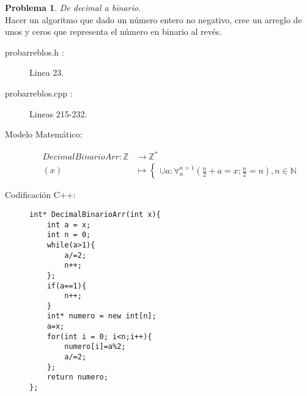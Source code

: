 \documentclass{article}
\theoremstyle{plain}
\theoremstyle{definition}
\newtheorem{problem}{Problema}
\begin{document}
\begin{problem} \emph{De decimal a binario.}\\
\hspace*{7mm}Hacer un algoritmo que dado un número entero no negativo, cree un arreglo de unos y ceros que representa el número en binario al revés.
\begin{description}
\item[probarreblos.h :] Linea 23. \item[probarreblos.cpp :] Lineas 215-232.

\item[Modelo Matemático:]
\begin{align*}
DecimalBinarioArr: \mathbb{Z} &\to \mathbb{Z}^{*}\\
(x) &\mapsto
\begin{cases}
\cup a : \forall_{n}^{n=1} \left(\frac{n}{2}+a=x; \frac{n}{2}= n\right), n\in \mathbb{N}
\end{cases}
\end{align*}
%
\item[Codificación \textsf{C++}:]\hfill
%
\begin{verbatim}
int* DecimalBinarioArr(int x){
    int a = x;
    int n = 0;
    while(a>1){
        a/=2;
        n++;
    };
    if(a==1){
        n++;
    }
    int* numero = new int[n];
    a=x;
    for(int i = 0; i<n;i++){
        numero[i]=a%2;
        a/=2;
    };
    return numero;
};
\end{verbatim}
\end{description}
\end{problem}
\end{document}
